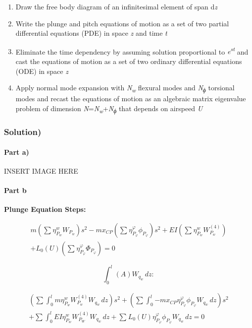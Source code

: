 \documentclass[11pt]{article}
\begin{document}
\begin{enumerate}
\def\labelenumi{(\alph{enumi})}
\item
  Draw the free body diagram of an infinitesimal element of span
  d\emph{z}
\item
  Write the plunge and pitch equations of motion as a set of two partial
  differential equations (PDE) in space \emph{z} and time \emph{t}
\item
  Eliminate the time dependency by assuming solution proportional to
  \emph{e\textsuperscript{st}} and cast the equations of motion as a set
  of two ordinary differential equations (ODE) in space \emph{z}
\item
  Apply normal mode expansion with \emph{N\textsubscript{w}} flexural
  modes and \emph{N\textsubscript{ϕ}} torsional modes and recast the
  equations of motion as an algebraic matrix eigenvalue problem of
  dimension \emph{N}=\emph{N\textsubscript{w}}+\emph{N\textsubscript{ϕ}}
  that depends on airspeed \emph{U}
\end{enumerate}

\subsubsection{Solution)}\label{solution-2}

\paragraph{Part a)}\label{part-a}
INSERT IMAGE HERE

\paragraph{Part b}\label{part-b}

\textbf{Plunge Equation Steps:}

\begin{multline}
m\left( \sum_{}^{}{\eta_{P_{w}}^{w}W_{P_{w}}} \right)s^{2}
- m x_{CP}\left( \sum_{}^{}{\eta_{P_{\varphi}}^{\varphi}\phi_{P_{\varphi}}} \right)s^{2}
+ EI\left( \sum_{}^{}{\eta_{P_{w}}^{w}W_{P_{w}}^{(4)}} \right)
\\
+ L_{0}(U)\left( \sum_{}^{}\eta_{P_{\varphi}}^{\varphi}\Phi_{P_{\varphi}} \right)
= 0
\end{multline}

\[
\int_{0}^{l}{(A)W_{q_{w}}\,dz}:
\]

\begin{multline}
\left(
  \sum_{}^{}{\int_{0}^{l}{m\eta_{P_{w}}^{w}W_{P_{w}}^{(4)}W_{q_{w}}\,dz}}
\right)s^{2}
+
\left(
  \sum_{}^{}{\int_{0}^{l}{- m x_{CP}\eta_{P_{\varphi}}^{\varphi}\phi_{P_{\varphi}}W_{q_{w}}\,dz}}
\right)s^{2}
\\
+
\sum_{}^{}{\int_{0}^{l}{EI\eta_{P_{w}}^{w}W_{P_{W}}^{(4)}W_{q_{w}}\,dz}}
+
\sum_{}^{}{L_{0}(U)\eta_{P_{\varphi}}^{\varphi}\phi_{P_{\varphi}}W_{q_{w}}\,dz}
= 0
\end{multline}
\end{document}
